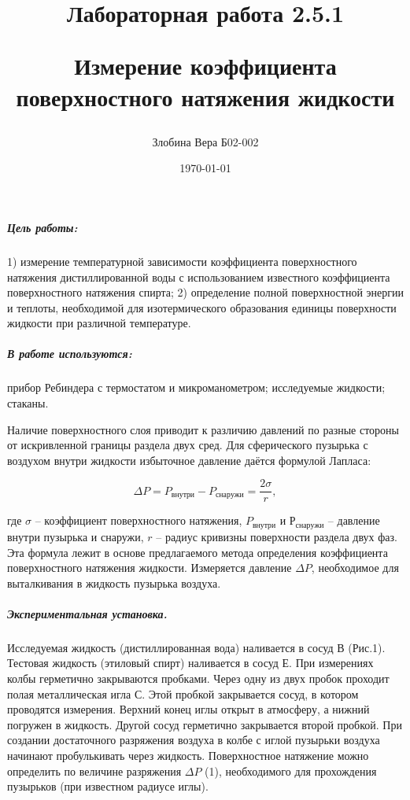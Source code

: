 \documentclass[a4paper,12pt]{article}
\author{Злобина Вера Б02-002}
\title{Лабораторная работа 2.5.1

Измерение коэффициента поверхностного натяжения жидкости}
\date{\today}
\begin{document}
\maketitle 

\newpage 

\subparagraph*{Цель работы:} 1) измерение температурной зависимости  коэффициента поверхностного натяжения дистиллированной воды с использованием известного коэффициента поверхностного натяжения спирта;  2) определение полной поверхностной энергии  и теплоты, необходимой для изотермического образования единицы  поверхности жидкости  при различной температуре. 


\subparagraph*{В работе используются:}прибор  Ребиндера  с термостатом и микроманометром; исследуемые жидкости; стаканы.





Наличие поверхностного слоя приводит к различию давлений по разные стороны от искривленной границы раздела двух сред.  Для сферического пузырька с воздухом  внутри жидкости избыточное давление даётся формулой Лапласа:

\begin{equation}
\Delta P = P_{внутри}- P_{снаружи}=\frac{2\sigma}{r}, 
\end{equation}

где $\sigma$ -- коэффициент поверхностного натяжения, $P_{внутри}$ и $Р_{снаружи}$ -- давление внутри пузырька и снаружи, $r$ -- радиус кривизны поверхности раздела двух фаз. Эта формула лежит в основе предлагаемого метода определения коэффициента поверхностного натяжения жидкости. Измеряется давление $\Delta P$, необходимое для выталкивания в жидкость пузырька воздуха.



\subparagraph*{Экспериментальная установка.} Исследуемая жидкость (дистиллированная вода) наливается в сосуд В (Рис.1). Тестовая жидкость  (этиловый спирт) наливается  в сосуд Е.  При измерениях  колбы герметично закрываются  пробками.   Через одну из двух пробок  проходит полая металлическая игла С. Этой пробкой закрывается сосуд, в котором  проводятся измерения. Верхний конец иглы открыт в атмосферу, а нижний погружен в жидкость. Другой сосуд герметично закрывается второй пробкой. При создании достаточного  разряжения воздуха в колбе с иглой пузырьки воздуха начинают пробулькивать через жидкость. Поверхностное натяжение можно определить по величине разряжения $\Delta P$ (1), необходимого для прохождения пузырьков (при известном радиусе иглы).
\end{document}
